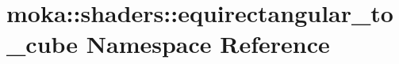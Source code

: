 \hypertarget{namespacemoka_1_1shaders_1_1equirectangular__to__cube}{}\section{moka\+::shaders\+::equirectangular\+\_\+to\+\_\+cube Namespace Reference}
\label{namespacemoka_1_1shaders_1_1equirectangular__to__cube}
